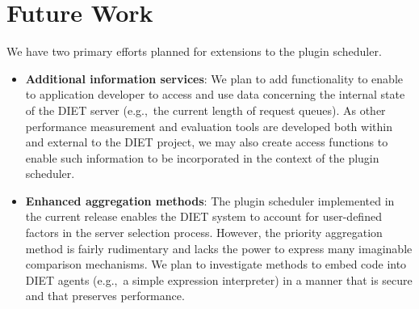 \section{Future Work}

We have two primary efforts planned for extensions to the plugin
scheduler.
\begin{itemize}
\item \textbf{Additional information services}: We plan to add
  functionality to enable to application developer to access and use
  data concerning the internal state of the DIET server (e.g.,~the
  current length of request queues).  As other performance measurement
  and evaluation tools are developed both within and external to the
  DIET project, we may also create access functions to enable such
  information to be incorporated in the context of the plugin
  scheduler.
\item \textbf{Enhanced aggregation methods}: The plugin scheduler
  implemented in the current release enables the DIET system to
  account for user-defined factors in the server selection process.
  However, the priority aggregation method is fairly rudimentary and
  lacks the power to express many imaginable comparison mechanisms.
  We plan to investigate methods to embed code into DIET agents
  (e.g.,~a simple expression interpreter) in a manner that is secure
  and that preserves performance.
\end{itemize}

